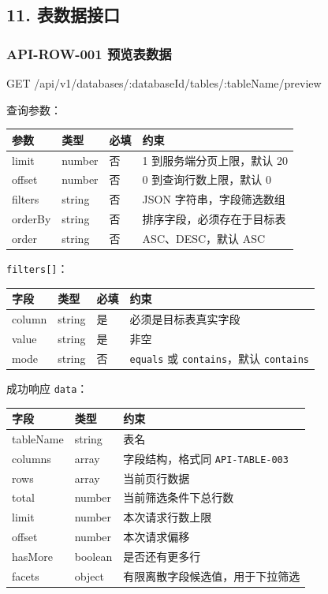 \documentclass[
  a4paper,
  UTF8]{ctexart}
\newenvironment{Shaded}{}{}
\newcommand{\NormalTok}[1]{#1}
\begin{document}
\hypertarget{ux8868ux6570ux636eux63a5ux53e3}{%
\subsection{11. 表数据接口}\label{ux8868ux6570ux636eux63a5ux53e3}}

\hypertarget{api-row-001-ux9884ux89c8ux8868ux6570ux636e}{%
\subsubsection{API-ROW-001
预览表数据}\label{api-row-001-ux9884ux89c8ux8868ux6570ux636e}}

\begin{Shaded}
\begin{Highlighting}[]
\NormalTok{GET /api/v1/databases/:databaseId/tables/:tableName/preview}
\end{Highlighting}
\end{Shaded}

查询参数：

\begin{longtable}[]{@{}llll@{}}
\toprule
参数 & 类型 & 必填 & 约束 \\
\midrule
\endhead
limit & number & 否 & 1 到服务端分页上限，默认 20 \\
offset & number & 否 & 0 到查询行数上限，默认 0 \\
filters & string & 否 & JSON 字符串，字段筛选数组 \\
orderBy & string & 否 & 排序字段，必须存在于目标表 \\
order & string & 否 & ASC、DESC，默认 ASC \\
\bottomrule
\end{longtable}

\texttt{filters{[}{]}}：

\begin{longtable}[]{@{}llll@{}}
\toprule
字段 & 类型 & 必填 & 约束 \\
\midrule
\endhead
column & string & 是 & 必须是目标表真实字段 \\
value & string & 是 & 非空 \\
mode & string & 否 & \texttt{equals} 或 \texttt{contains}，默认
\texttt{contains} \\
\bottomrule
\end{longtable}

成功响应 \texttt{data}：

\begin{longtable}[]{@{}lll@{}}
\toprule
字段 & 类型 & 约束 \\
\midrule
\endhead
tableName & string & 表名 \\
columns & array & 字段结构，格式同 \texttt{API-TABLE-003} \\
rows & array & 当前页行数据 \\
total & number & 当前筛选条件下总行数 \\
limit & number & 本次请求行数上限 \\
offset & number & 本次请求偏移 \\
hasMore & boolean & 是否还有更多行 \\
facets & object & 有限离散字段候选值，用于下拉筛选 \\
\bottomrule
\end{longtable}
\end{document}
